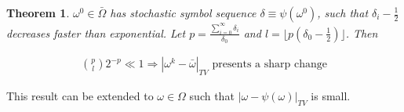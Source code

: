 \documentclass[landscape,a0b,final]{a0poster}
\newtheorem{theorem}{Theorem}
\newenvironment{poster}{
  \begin{center}
  \begin{minipage}[c]{0.98\textwidth}
}{
  \end{minipage} 
  \end{center}
}
\newenvironment{pcolumn}[1]{
  \begin{minipage}{#1\textwidth}
  \begin{center}
}{
  \end{center}
  \end{minipage}
}
\begin{document}
\begin{poster}
\begin{center}
\begin{pcolumn}{0.32}
{\begin{theorem}
$\omega^0 \in \bar{\Omega}$ has stochastic symbol sequence $\delta \equiv \psi(\omega^0)$, such that $\delta_i-\frac{1}{2}$ decreases faster than exponential. Let $p  = \frac{\sum_{i=0}^{\infty} \delta_i}{\delta_{0}}$ and $l = \lfloor p(\delta_{0}-\frac{1}{2})\rfloor$. Then

\vspace{-1.3cm}
  \begin{eqnarray}
    {p \choose l}2^{-p} \ll 1  \Rightarrow |\omega^k-\bar{\omega}|_{TV} \mbox{ presents a sharp change}
  \end{eqnarray}
\end{theorem}

\vspace{-0.8cm}
This result can be extended to $\omega \in \Omega$ such that $|\omega- \psi(\omega)|_{TV}$ is small. 
\vspace{0.3cm}

}
\end{pcolumn}
\end{center}
\end{poster}
\end{document}
